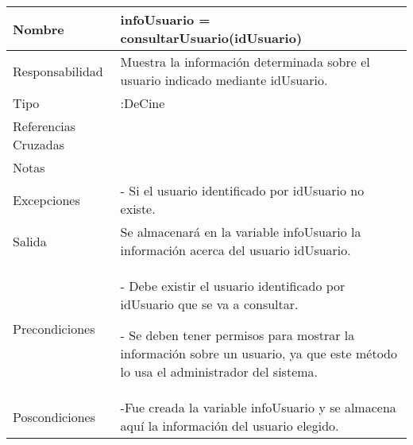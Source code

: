 \documentclass{article}
\begin{document}
\begin{table}[h]
\begin{tabular}{|l|l|l|l|l|l|}
\hline
\multicolumn{2}{|p{3cm}|}{Nombre} & \multicolumn{3}{p{8cm}|}{\textbf{infoUsuario = consultarUsuario(idUsuario)}}\\
\hline
\multicolumn{2}{|p{3cm}|}{Responsabilidad} & \multicolumn{4}{p{8cm}|}{Muestra la información determinada sobre el usuario indicado mediante idUsuario.} \\
\hline
\multicolumn{2}{|p{3cm}|}{Tipo} & \multicolumn{4}{p{8cm}|}{:DeCine} \\
\hline
\multicolumn{2}{|p{3cm}|}{Referencias Cruzadas} & \multicolumn{4}{p{8cm}|}{} \\
\hline
\multicolumn{2}{|p{3cm}|}{Notas} & \multicolumn{4}{p{8cm}|}{} \\
\hline
\multicolumn{2}{|p{3cm}|}{Excepciones} & \multicolumn{4}{p{8cm}|}{-	Si el usuario identificado por idUsuario no existe.} \\
\hline
\multicolumn{2}{|p{3cm}|}{Salida} & \multicolumn{4}{p{8cm}|}{Se almacenará en la variable infoUsuario la información acerca del usuario idUsuario.} \\
\hline
\multicolumn{2}{|p{3cm}|}{Precondiciones} & \multicolumn{4}{p{8cm}|}{- Debe existir el usuario identificado por idUsuario que se va a consultar.

- Se deben tener permisos para mostrar la información sobre un usuario, ya que este método lo usa el administrador del sistema.
} \\
\hline
\multicolumn{2}{|p{3cm}|}{Poscondiciones} & \multicolumn{4}{p{8cm}|}{-Fue creada la variable infoUsuario y se almacena aquí la información del usuario elegido.} \\
\hline
\end{tabular}
\end{table}
\end{document}
